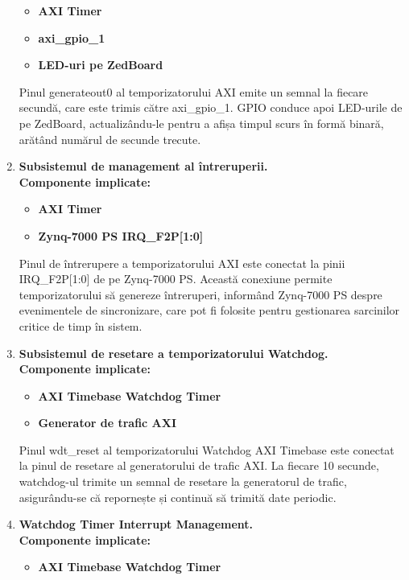 \documentclass[12pt]{article}
\begin{document}
\begin{enumerate}
\begin{itemize}
            \item \textbf{AXI Timer}
            \item \textbf{axi\_gpio\_1}
            \item \textbf{LED-uri pe ZedBoard}
        \end{itemize}
    \hspace*{1cm}Pinul generateout0 al temporizatorului AXI emite un semnal la fiecare secundă, care este trimis către axi\_gpio\_1. GPIO conduce apoi LED-urile de pe ZedBoard, actualizându-le pentru a afișa timpul scurs în formă binară, arătând numărul de secunde trecute.
    \item \textbf{Subsistemul de management al întreruperii.} \\
    \textbf{Componente implicate:}
        \begin{itemize}
            \item \textbf{AXI Timer}
            \item \textbf{Zynq-7000 PS IRQ\_F2P[1:0]}
        \end{itemize}
    \hspace*{1cm}Pinul de întrerupere a temporizatorului AXI este conectat la pinii IRQ\_F2P[1:0] de pe Zynq-7000 PS. Această conexiune permite temporizatorului să genereze întreruperi, informând Zynq-7000 PS despre evenimentele de sincronizare, care pot fi folosite pentru gestionarea sarcinilor critice de timp în sistem.
    \item \textbf{Subsistemul de resetare a temporizatorului Watchdog.} \\
    \textbf{Componente implicate:}
        \begin{itemize}
            \item \textbf{AXI Timebase Watchdog Timer}
            \item \textbf{Generator de trafic AXI}
        \end{itemize}
    \hspace*{1cm}Pinul wdt\_reset al temporizatorului Watchdog AXI Timebase este conectat la pinul de resetare al generatorului de trafic AXI. La fiecare 10 secunde, watchdog-ul trimite un semnal de resetare la generatorul de trafic, asigurându-se că repornește și continuă să trimită date periodic.
    \item \textbf{Watchdog Timer Interrupt Management.} \\
    \textbf{Componente implicate:}
        \begin{itemize}
            \item \textbf{AXI Timebase Watchdog Timer}

\end{itemize}
\end{enumerate}
\end{document}
